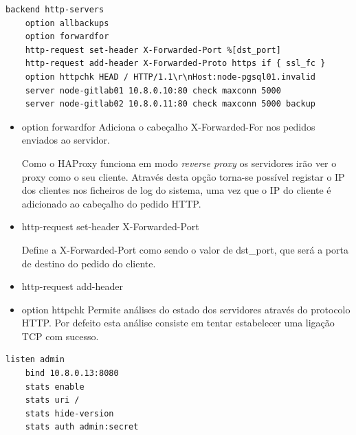 \documentclass[12pt,a4paper]{article}
\begin{document}
\begin{verbatim}
backend http-servers  
    option allbackups
    option forwardfor
    http-request set-header X-Forwarded-Port %[dst_port]
    http-request add-header X-Forwarded-Proto https if { ssl_fc }
    option httpchk HEAD / HTTP/1.1\r\nHost:node-pgsql01.invalid
    server node-gitlab01 10.8.0.10:80 check maxconn 5000
    server node-gitlab02 10.8.0.11:80 check maxconn 5000 backup

\end{verbatim}

\begin{itemize}
    \item option forwardfor
Adiciona o cabeçalho X-Forwarded-For nos pedidos enviados ao servidor.

Como o HAProxy funciona em modo \emph{reverse proxy} os servidores irão ver o proxy como o seu cliente. Através desta opção torna-se possível registar o IP dos clientes nos ficheiros de log do sistema, uma vez que o IP do cliente é adicionado ao cabeçalho do pedido HTTP.
    
    \item http-request set-header X-Forwarded-Port
    
Define a X-Forwarded-Port como sendo o valor de dst\_port, que será a porta de destino do pedido do cliente.
    
    \item http-request add-header
    
    
    \item option httpchk
Permite análises do estado dos servidores através do protocolo HTTP. Por defeito esta análise consiste em tentar estabelecer uma ligação TCP com sucesso.

\end{itemize}

\begin{verbatim}
listen admin  
    bind 10.8.0.13:8080
    stats enable
    stats uri /
    stats hide-version
    stats auth admin:secret
\end{verbatim}
\end{document}
